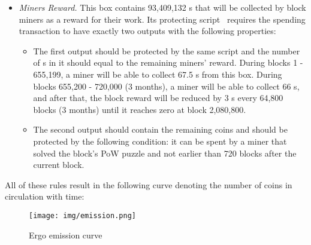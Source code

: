 \begin{itemize}
    \item{\em Miners Reward.} This box contains 93,409,132 \Erg{}s that will be collected by block miners
    as a reward for their work.
    Its protecting script~\cite{scriptEmission} requires the spending transaction to have exactly two outputs with the following properties:

    \begin{itemize}
    \item{} The first output should be protected by the same script and the number of \Erg{}s in it should
    equal to the remaining miners' reward.
    During blocks 1 - 655,199, a miner will be able to collect 67.5 \Erg{}s from this box. During blocks 655,200 - 720,000 (3 months), a miner will be able to collect 66 \Erg{}s, and after that, the block reward will be reduced by 3 \Erg{}s every 64,800 blocks (3 months) until it reaches zero at block 2,080,800.

    \item{} The second output should contain the remaining coins and should be protected by the following condition:
    it can be spent by a miner that solved the block's PoW puzzle and not earlier than 720 blocks after the current block.
    \end{itemize}

\end{itemize}

All of these rules result in the following curve denoting the number of coins in circulation with time:

\begin{figure}[H]
    \centering
    \texttt{[image: img/emission.png]}
    \caption{Ergo emission curve
    \label{fig:emission} }
\end{figure}
